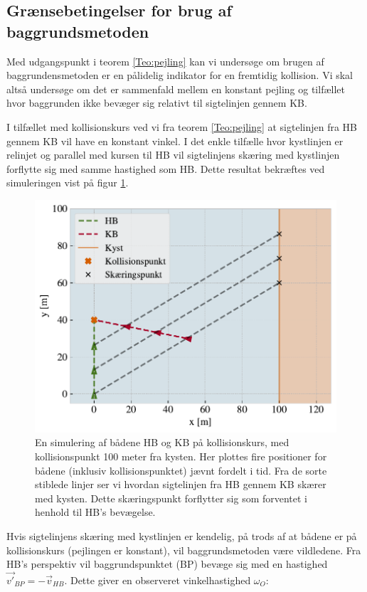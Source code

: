 \documentclass[%
 reprint,
nofootinbib,
aps,
]{revtex4-1}
\begin{document}
 \subsection{Grænsebetingelser for brug af baggrundsmetoden}
 Med udgangspunkt i teorem \ref{Teo:pejling} kan vi undersøge om brugen af baggrundensmetoden er en pålidelig indikator for en fremtidig kollision. Vi skal altså undersøge om det er sammenfald mellem en konstant pejling og tilfællet hvor baggrunden ikke bevæger sig relativt til sigtelinjen gennem KB. \par
 I tilfællet med kollisionskurs ved vi fra teorem \ref{Teo:pejling} at sigtelinjen fra HB gennem KB vil have en konstant vinkel. I det enkle tilfælle hvor kystlinjen er relinjet og parallel med kursen til HB vil sigtelinjens skæring med kystlinjen forflytte sig med samme hastighed som HB. Dette resultat bekræftes ved simuleringen vist på figur \ref{fig:eks1}.
 \begin{figure}[H]
   \includegraphics[width=\linewidth]{figures/eksempel1.pdf}
   \caption{En simulering af bådene HB og KB på kollisionskurs, med kollisionspunkt 100 meter fra kysten. Her plottes fire positioner for bådene (inklusiv kollisionspunktet) jævnt fordelt i tid. Fra de sorte stiblede linjer ser vi hvordan sigtelinjen fra HB gennem KB skærer med kysten. Dette skæringspunkt forflytter sig som forventet i henhold til HB's bevægelse.}
   \label{fig:eks1}
 \end{figure}
 Hvis sigtelinjens skæring med kystlinjen er kendelig, på trods af at bådene er på kollisionskurs (pejlingen er konstant), vil baggrundsmetoden være vildledene. Fra HB's perspektiv vil baggrundspunktet (BP) bevæge sig med en hastighed $\vec{v'}_{BP} = - \vec{v}_{HB}$. Dette giver en observeret vinkelhastighed $\omega_O$:
\end{document}
